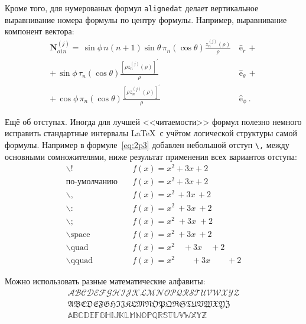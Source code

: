 Кроме того, для  нумерованых формул \verb|alignedat| делает вертикальное
выравнивание номера формулы по центру формулы. Например, выравнивание
компонент вектора:
\begin{equation}
 \label{eq:2p3}
 \begin{alignedat}{2}
{\mathbf{N}}_{o1n}^{(j)} = \,{\sin} \phi\,n\!\left(n+1\right)
         {\sin}\theta\,
         \pi_n\!\left({\cos} \theta\right)
         \frac{
               z_n^{(j)}\!\left( \rho \right)
              }{\rho}\,
           &{\boldsymbol{\hat{\mathrm e}}}_{r}\,+   \\
+\,
{\sin} \phi\,
         \tau_n\!\left({\cos} \theta\right)
         \frac{
            \left[\rho z_n^{(j)}\!\left( \rho \right)\right]^{\prime}
              }{\rho}\,
            &{\boldsymbol{\hat{\mathrm e}}}_{\theta}\,+   \\
+\,
{\cos} \phi\,
         \pi_n\!\left({\cos} \theta\right)
         \frac{
            \left[\rho z_n^{(j)}\!\left( \rho \right)\right]^{\prime}
              }{\rho}\,
            &{\boldsymbol{\hat{\mathrm e}}}_{\phi}\:.
\end{alignedat}
\end{equation}

Ещё об отступах. Иногда для лучшей <<читаемости>> формул полезно
немного исправить стандартные интервалы \LaTeX\ с учётом логической
структуры самой формулы. Например в формуле~\ref{eq:2p3} добавлен
небольшой отступ \verb+\,+ между основными сомножителями, ниже
результат применения всех вариантов отступа:
\begin{align*}
\backslash! &\quad f(x) = x^2\! +3x\! +2 \\
  \mbox{по-умолчанию} &\quad f(x) = x^2+3x+2 \\
\backslash, &\quad f(x) = x^2\, +3x\, +2 \\
\backslash{:} &\quad f(x) = x^2\: +3x\: +2 \\
\backslash; &\quad f(x) = x^2\; +3x\; +2 \\
\backslash \mbox{space} &\quad f(x) = x^2\ +3x\ +2 \\
\backslash \mbox{quad} &\quad f(x) = x^2\quad +3x\quad +2 \\
\backslash \mbox{qquad} &\quad f(x) = x^2\qquad +3x\qquad +2
\end{align*}

Можно использовать разные математические алфавиты:
\begin{align}
\mathcal{ABCDEFGHIJKLMNOPQRSTUVWXYZ} \nonumber \\
\mathfrak{ABCDEFGHIJKLMNOPQRSTUVWXYZ} \nonumber \\
\mathbb{ABCDEFGHIJKLMNOPQRSTUVWXYZ} \nonumber
\end{align}

